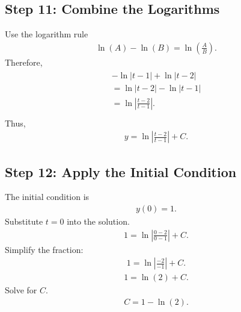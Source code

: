 \documentclass[letterpaper,10pt,english]{sphinxmanual}
\begin{document}
\subsection{Step 11: Combine the Logarithms}
\label{\detokenize{Language/Science_language/ODE_calculus/course_MATH_3035/homework_assignments/index_pdf:step-11-combine-the-logarithms}}
\sphinxAtStartPar
Use the logarithm rule
\begin{equation*}
\begin{split}\ln(A)-\ln(B)
=
\ln\left(\frac{A}{B}\right).\end{split}
\end{equation*}
\sphinxAtStartPar
Therefore,
\begin{align*}\!\begin{aligned}
-\ln|t-1|
+
\ln|t-2|\\
=
\ln|t-2|
-
\ln|t-1|\\
=
\ln\left|
\frac{t-2}{t-1}
\right|.\\
\end{aligned}\end{align*}
\sphinxAtStartPar
Thus,
\begin{equation*}
\begin{split}y
=
\ln\left|
\frac{t-2}{t-1}
\right|
+C.\end{split}
\end{equation*}

\subsection{Step 12: Apply the Initial Condition}
\label{\detokenize{Language/Science_language/ODE_calculus/course_MATH_3035/homework_assignments/index_pdf:step-12-apply-the-initial-condition}}
\sphinxAtStartPar
The initial condition is
\begin{equation*}
\begin{split}y(0)=1.\end{split}
\end{equation*}
\sphinxAtStartPar
Substitute \(t=0\) into the solution.
\begin{equation*}
\begin{split}1
=
\ln\left|
\frac{0-2}{0-1}
\right|
+C.\end{split}
\end{equation*}
\sphinxAtStartPar
Simplify the fraction:
\begin{equation*}
\begin{split}1
=
\ln\left|
\frac{-2}{-1}
\right|
+C.\end{split}
\end{equation*}\begin{equation*}
\begin{split}1
=
\ln(2)
+C.\end{split}
\end{equation*}
\sphinxAtStartPar
Solve for \(C\).
\begin{equation*}
\begin{split}C=1-\ln(2).\end{split}
\end{equation*}
\end{document}
